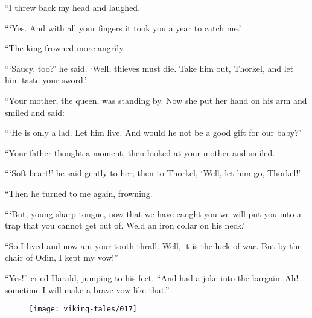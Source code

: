 ``I threw back my head and laughed.

```Yes. And with all your fingers it took you a year to catch me.'

``The king frowned more angrily.

```Saucy, too?' he said. `Well, thieves must die. Take him out, Thorkel,
and let him taste your sword.'

``Your mother, the queen, was standing by. Now she put her hand on his
arm and smiled and said:

```He is only a lad. Let him live. And would he not be a good gift for
our baby?'

``Your father thought a moment, then looked at your mother and smiled.

```Soft heart!' he said gently to her; then to Thorkel, `Well, let him
go, Thorkel!'

``Then he turned to me again, frowning.

```But, young sharp-tongue, now that we have caught you we will put you
into a trap that you cannot get out of. Weld an iron collar on his
neck.'

``So I lived and now am your tooth thrall. Well, it is the luck of war.
But by the chair of Odin, I kept my vow!''

``Yes!'' cried Harald, jumping to his feet. ``And had a joke into the
bargain. Ah! sometime I will make a brave vow like that.''

\begin{figure}[hb]
    \centering
    \vskip8pt
    \texttt{[image: viking-tales/017]}
\end{figure}
